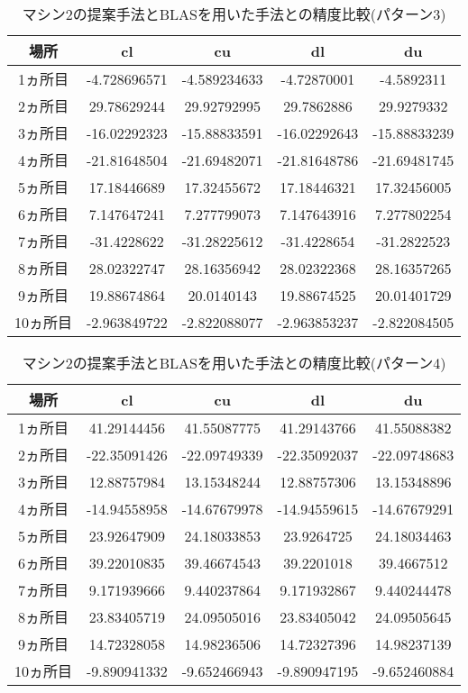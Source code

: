 \documentclass[11pt,a4paper]{jsreport}
\theoremstyle{definition}
\begin{document}
\begin{table}[H]
\centering
\begin{tabular}{|c|c|c|c|c|}
\hline
場所 & cl & cu & dl & du \\ \hline
1ヵ所目 & -4.728696571 & -4.589234633 & -4.72870001 & -4.5892311 \\ \hline
2ヵ所目 & 29.78629244 & 29.92792995 & 29.7862886 & 29.9279332 \\ \hline
3ヵ所目 & -16.02292323 & -15.88833591 & -16.02292643 & -15.88833239 \\ \hline
4ヵ所目 & -21.81648504 & -21.69482071 & -21.81648786 & -21.69481745 \\ \hline
5ヵ所目 & 17.18446689 & 17.32455672 & 17.18446321 & 17.32456005 \\ \hline
6ヵ所目 & 7.147647241 & 7.277799073 & 7.147643916 & 7.277802254 \\ \hline
7ヵ所目 & -31.4228622 & -31.28225612 & -31.4228654 & -31.2822523 \\ \hline
8ヵ所目 & 28.02322747 & 28.16356942 & 28.02322368 & 28.16357265 \\ \hline
9ヵ所目 & 19.88674864 & 20.0140143 & 19.88674525 & 20.01401729 \\ \hline
10ヵ所目 & -2.963849722 & -2.822088077 & -2.963853237 & -2.822084505 \\ \hline
\end{tabular}
\caption{マシン2の提案手法とBLASを用いた手法との精度比較(パターン3)}
\end{table}

\begin{table}[H]
\centering
\begin{tabular}{|c|c|c|c|c|}
\hline
場所 & cl & cu & dl & du \\ \hline
1ヵ所目 & 41.29144456 & 41.55087775 & 41.29143766 & 41.55088382 \\ \hline
2ヵ所目 & -22.35091426 & -22.09749339 & -22.35092037 & -22.09748683 \\ \hline
3ヵ所目 & 12.88757984 & 13.15348244 & 12.88757306 & 13.15348896 \\ \hline
4ヵ所目 & -14.94558958 & -14.67679978 & -14.94559615 & -14.67679291 \\ \hline
5ヵ所目 & 23.92647909 & 24.18033853 & 23.9264725 & 24.18034463 \\ \hline
6ヵ所目 & 39.22010835 & 39.46674543 & 39.2201018 & 39.4667512 \\ \hline
7ヵ所目 & 9.171939666 & 9.440237864 & 9.171932867 & 9.440244478 \\ \hline
8ヵ所目 & 23.83405719 & 24.09505016 & 23.83405042 & 24.09505645 \\ \hline
9ヵ所目 & 14.72328058 & 14.98236506 & 14.72327396 & 14.98237139 \\ \hline
10ヵ所目 & -9.890941332 & -9.652466943 & -9.890947195 & -9.652460884 \\ \hline
\end{tabular}
\caption{マシン2の提案手法とBLASを用いた手法との精度比較(パターン4)}
\end{table}
\end{document}
